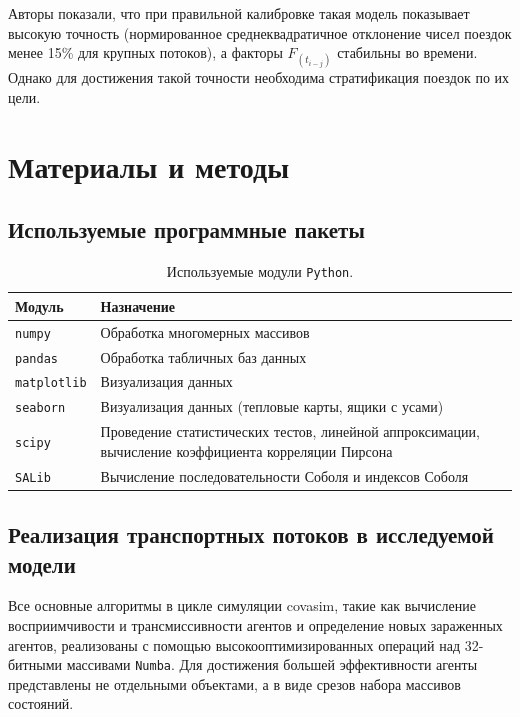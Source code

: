 \documentclass[a4paper,12pt]{article} %
\begin{document}
Авторы показали, что при правильной калибровке такая модель показывает высокую точность (нормированное среднеквадратичное отклонение чисел поездок менее 15\% для крупных потоков), а факторы $F_{(t_{i-j})}$ стабильны во времени. Однако для достижения такой точности необходима стратификация поездок по их цели.



\section{Материалы и методы}
\subsection{Используемые программные пакеты}
\begin{table}[H]
\centering
\begin{tabular}{p{4cm} p{10cm}}
\toprule
\textbf{Модуль} & \textbf{Назначение} \\
\midrule
\texttt{numpy} \cite{harris2020array} & Обработка многомерных массивов \\
\texttt{pandas} \cite{reback2020pandas} & Обработка табличных баз данных \\
\texttt{matplotlib} \cite{Hunter:2007} & Визуализация данных \\
\texttt{seaborn} \cite{michael_waskom_2017_883859} & Визуализация данных (тепловые карты, ящики с усами) \\
\texttt{scipy} \cite{2020SciPy-NMeth} & Проведение статистических тестов, линейной аппроксимации, вычисление коэффициента корреляции Пирсона \\
\texttt{SALib} \cite{Iwanaga2022, Herman2017} & Вычисление последовательности Соболя и индексов Соболя \\
\bottomrule
\end{tabular}
\caption{Используемые модули \texttt{Python}.}
\end{table}
\subsection{Реализация транспортных потоков в исследуемой модели}

Все основные алгоритмы в цикле симуляции \gls{covasim}, такие как вычисление восприимчивости и трансмиссивности агентов и определение новых зараженных агентов, реализованы с помощью высокооптимизированных операций над 32-битными массивами \texttt{Numba}. Для достижения большей эффективности агенты представлены не отдельными объектами, а в виде срезов набора массивов состояний.
\end{document}
